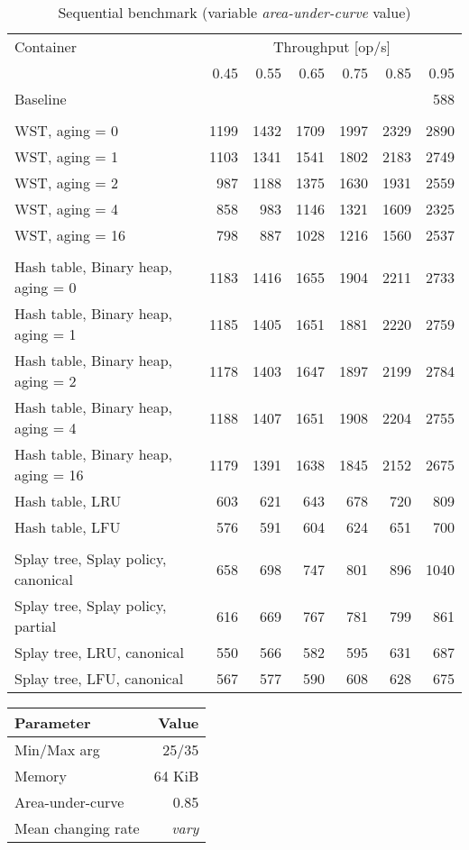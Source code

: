 \begin{table}
\caption{Sequential benchmark (variable \emph{area-under-curve} value)}
\begin{tabular}[]{l r r r r r r} \toprule
Container & \multicolumn{6}{c}{Throughput [op/s]} \\ \cmidrule(r){2-7}
& 0.45 & 0.55 & 0.65 & 0.75 & 0.85 & 0.95 \\ \midrule
Baseline & \multicolumn{6}{r}{588}  \\
\\
WST, aging = 0 & 1199 & 1432 & 1709 & 1997 & 2329 & 2890 \\
WST, aging = 1 & 1103 & 1341 & 1541 & 1802 & 2183 & 2749 \\
WST, aging = 2 & 987 & 1188 & 1375 & 1630 & 1931 & 2559 \\
WST, aging = 4 & 858 & 983 & 1146 & 1321 & 1609 & 2325 \\
WST, aging = 16 & 798 & 887 & 1028 & 1216 & 1560 & 2537 \\
\\
Hash table, Binary heap, aging = 0 & 1183 & 1416 & 1655 & 1904 & 2211 & 2733 \\
Hash table, Binary heap, aging = 1 & 1185 & 1405 & 1651 & 1881 & 2220 & 2759 \\
Hash table, Binary heap, aging = 2 & 1178 & 1403 & 1647 & 1897 & 2199 & 2784 \\
Hash table, Binary heap, aging = 4 & 1188 & 1407 & 1651 & 1908 & 2204 & 2755 \\
Hash table, Binary heap, aging = 16 & 1179 & 1391 & 1638 & 1845 & 2152 & 2675 \\
Hash table, LRU & 603 & 621 & 643 & 678 & 720 & 809 \\
Hash table, LFU & 576 & 591 & 604 & 624 & 651 & 700 \\
\\
Splay tree, Splay policy, canonical & 658 & 698 & 747 & 801 & 896 & 1040 \\
Splay tree, Splay policy, partial & 616 & 669 & 767 & 781 & 799 & 861 \\
Splay tree, LRU, canonical & 550 & 566 & 582 & 595 & 631 & 687 \\
Splay tree, LFU, canonical & 567 & 577 & 590 & 608 & 628 & 675 \\
\bottomrule
\end{tabular}
\end{table}

\pagebreak

\begin{tabular}[h]{l r} \toprule
Parameter & Value \\ \midrule
Min/Max arg & 25/35 \\
Memory & 64 KiB \\
Area-under-curve & 0.85 \\
Mean changing rate & \emph{vary} \\ \bottomrule
\end{tabular}

